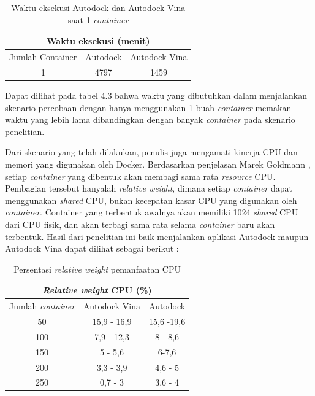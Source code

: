 \begin{table}
	\centering
	\begin{tabular}{|c|c|c|}
		\hline
		\multicolumn{3}{|c|}{Waktu eksekusi (menit)} \\ \hline
		Jumlah Container & Autodock & Autodock Vina \\ \hline
		1 & 4797 & 1459 \\ \hline
	\end{tabular}
	\caption{Waktu eksekusi Autodock dan Autodock Vina saat 1 \textit{container}}
	\label{my-label}
\end{table}

Dapat dilihat pada tabel 4.3 bahwa waktu yang dibutuhkan dalam menjalankan skenario percobaan dengan hanya menggunakan 1 buah \textit{container} memakan waktu yang lebih lama dibandingkan dengan banyak \textit{container} pada skenario penelitian.

Dari skenario yang telah dilakukan, penulis juga mengamati kinerja CPU dan memori yang digunakan oleh Docker. Berdasarkan penjelasan Marek Goldmann \cite{Marek Goldmann} , setiap \textit{container} yang dibentuk akan membagi sama rata \textit{resource} CPU. Pembagian tersebut hanyalah \textit{relative weight}, dimana setiap \textit{container} dapat menggunakan \textit{shared} CPU, bukan kecepatan kasar CPU yang digunakan oleh \textit{container}. Container yang terbentuk awalnya akan memiliki 1024 \textit{shared} CPU dari CPU fisik, dan akan terbagi sama rata selama \textit{container} baru akan terbentuk. Hasil dari penelitian ini baik menjalankan aplikasi Autodock maupun Autodock Vina dapat dilihat sebagai berikut :
\begin{table}
	\centering
	\begin{tabular}{|c|c|c|}
		\hline
		\multicolumn{3}{|c|}{\textit{Relative weight} CPU (\%)} \\ \hline
		Jumlah \textit{container} & Autodock Vina & Autodock \\ \hline
		50 & 15,9 - 16,9 & 15,6 -19,6 \\ \hline
		100 & 7,9 - 12,3 & 8 - 8,6 \\ \hline
		150 & 5 - 5,6 & 6-7,6 \\ \hline
		200 & 3,3 - 3,9 & 4,6 - 5 \\ \hline
		250 & 0,7 - 3 & 3,6 - 4 \\ \hline
	\end{tabular}
	\caption{Persentasi \textit{relative weight} pemanfaatan CPU}
	\label{my-label}
\end{table}

